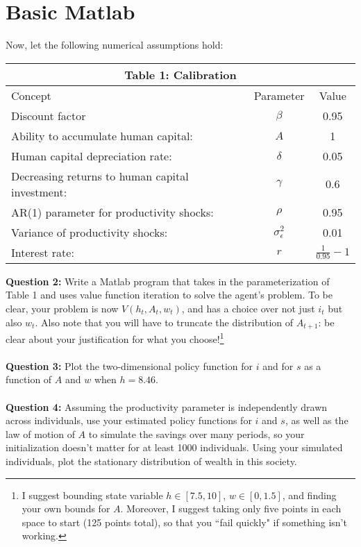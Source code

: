 \documentclass[11pt]{article}
\begin{document}
\section{Basic Matlab}
Now, let the following numerical assumptions hold:
\begin{table}[ht!]
\centering
\begin{tabular}{lcc}
\hline
\hline
\multicolumn{3}{c}{Table 1: Calibration}\\
\hline
Concept & Parameter & Value \\ 
Discount factor & $\beta$ & 0.95\\
Ability to accumulate human capital: &  $A$ & 1\\
Human capital depreciation rate:&  $\delta$  & 0.05\\
Decreasing returns to human capital investment: & $\gamma$  & 0.6\\
AR(1) parameter for productivity shocks: & $\rho$  & 0.95\\
Variance of productivity shocks: &  $\sigma^2_\epsilon$  & 0.01\\
Interest rate: &  $r$  & $\frac{1}{0.95}-1$\\
\hline
\hline
\end{tabular}
\end{table}

\textbf{Question 2:} Write a Matlab program that takes in the parameterization of Table 1 and uses value function iteration to solve the agent's problem.  To be clear, your problem is now $V(h_t,A_t,w_t)$, and has a choice over not just $i_t$ but also $w_t$.  Also note that you will have to truncate the distribution of $A_{t+1}$:  be clear about your justification for what you choose!\footnote{I suggest bounding state variable $h\in\left[7.5,10\right]$, $w\in\left[0 , 1.5\right]$, and finding your own bounds for $A$.  Moreover, I suggest taking only five points in each space to start (125 points total), so that you ``fail quickly" if something isn't working.  }\\
\ \\

\textbf{Question 3:} Plot the two-dimensional policy function for $i$ and for $s$ as a function of $A$ and $w$ when $h=8.46$.  \\
\ \\

\textbf{Question 4:} Assuming the productivity parameter is independently drawn across individuals, use your estimated policy functions for $i$ and $s$, as well as the law of motion of $A$ to simulate the savings over many periods, so your initialization doesn't matter for at least 1000 individuals.  Using your simulated individuals, plot the stationary distribution of wealth in this society.
\end{document}
